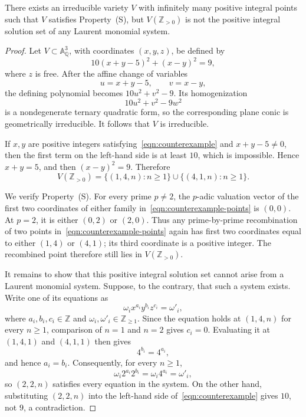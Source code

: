 \documentclass[10pt,a4paper]{amsart}
\begin{document}
\begin{proposition}\label{prop:conter}
There exists an irreducible variety \(V\) with infinitely many positive integral points such that \(V\) satisfies Property~(S), but \(V(\mathbb{Z}_{>0})\) is not the positive integral solution set of any Laurent monomial system.
\end{proposition}

\begin{proof}
Let \(V\subset \mathbb{A}^{3}_{\mathbb{Q}}\), with coordinates \((x,y,z)\), be defined by
\begin{equation}\label{eqn:counterexample}
10(x+y-5)^2+(x-y)^2=9,
\end{equation}
where \(z\) is free. After the affine change of variables
\[
u=x+y-5,\qquad v=x-y,
\]
the defining polynomial becomes \(10u^2+v^2-9\). Its homogenization
\[
10u^2+v^2-9w^2
\]
is a nondegenerate ternary quadratic form, so the corresponding plane conic is geometrically irreducible. It follows that \(V\) is irreducible.

If \(x,y\) are positive integers satisfying~\eqref{eqn:counterexample} and \(x+y-5\neq 0\), then the first term on the left-hand side is at least \(10\), which is impossible. Hence \(x+y=5\), and then \((x-y)^2=9\). Therefore
\begin{equation}\label{eqn:counterexample-points}
V(\mathbb{Z}_{>0})
=\{(1,4,n):n\geq 1\}\mathbin{\cup}\{(4,1,n):n\geq 1\}.
\end{equation}

We verify Property~(S). For every prime \(p\neq 2\), the \(p\)-adic valuation vector of the first two coordinates of either family in~\eqref{eqn:counterexample-points} is \((0,0)\). At \(p=2\), it is either \((0,2)\) or \((2,0)\). Thus any prime-by-prime recombination of two points in~\eqref{eqn:counterexample-points} again has first two coordinates equal to either \((1,4)\) or \((4,1)\); its third coordinate is a positive integer. The recombined point therefore still lies in \(V(\mathbb{Z}_{>0})\).

It remains to show that this positive integral solution set cannot arise from a Laurent monomial system. Suppose, to the contrary, that such a system exists. Write one of its equations as
\[
\omega_i x^{a_i}y^{b_i}z^{c_i}=\omega'_i,
\]
where \(a_i,b_i,c_i\in\mathbb{Z}\) and \(\omega_i,\omega'_i\in\mathbb{Z}_{\geq 1}\). Since the equation holds at \((1,4,n)\) for every \(n\geq 1\), comparison of \(n=1\) and \(n=2\) gives \(c_i=0\). Evaluating it at \((1,4,1)\) and \((4,1,1)\) then gives
\[
4^{b_i}=4^{a_i},
\]
and hence \(a_i=b_i\). Consequently, for every \(n\geq 1\),
\[
\omega_i 2^{a_i}2^{b_i}
=\omega_i4^{a_i}
=\omega'_i,
\]
so \((2,2,n)\) satisfies every equation in the system. On the other hand, substituting \((2,2,n)\) into the left-hand side of~\eqref{eqn:counterexample} gives \(10\), not \(9\), a contradiction.
\end{proof}
\end{document}
